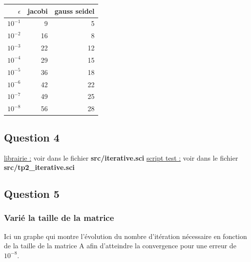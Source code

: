\documentclass[11pt]{article}
\begin{document}
\begin{center}
  \begin{tabular}{|r|r|r|}
    \hline
    $\epsilon$ & jacobi & gauss seidel \\ \hline
    $10^{-1}$ & 9 & 5 \\ \hline
    $10^{-2}$ & 16 & 8 \\ \hline
    $10^{-3}$ & 22 & 12 \\ \hline
    $10^{-4}$ & 29 & 15 \\ \hline
    $10^{-5}$ & 36 & 18 \\ \hline
    $10^{-6}$ & 42 & 22 \\ \hline
    $10^{-7}$ & 49 & 25 \\ \hline
    $10^{-8}$ & 56 & 28 \\ \hline
  \end{tabular}
\end{center}

\subsection{Question 4}

\underline{librairie :} voir dans le fichier
\textbf{src/iterative.sci}\newline
\vspace{5mm}
\underline{script test :} voir dans le fichier
\textbf{src/tp2\_iterative.sci}

\subsection{Question 5}

\subsubsection{Varié la taille de la matrice}

Ici un graphe qui montre l'évolution du nombre d'itération nécessaire
en fonction de la taille de la matrice A afin d'atteindre la
convergence pour une erreur de $10^{-8}$.
\end{document}
